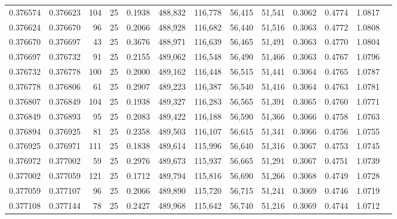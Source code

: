 \begin{tabular}{rrrrrrrrrrrrr}
0.376574 & 0.376623 &   104 &  25 &                                     0.1938 & 488,832 & 116,778 &  56,415 &  51,541 & 0.3062 & 0.4774 & 1.0817 \\
0.376624 & 0.376670 &    96 &  25 &                                     0.2066 & 488,928 & 116,682 &  56,440 &  51,516 & 0.3063 & 0.4772 & 1.0808 \\
0.376670 & 0.376697 &    43 &  25 &                                     0.3676 & 488,971 & 116,639 &  56,465 &  51,491 & 0.3063 & 0.4770 & 1.0804 \\
0.376697 & 0.376732 &    91 &  25 &                                     0.2155 & 489,062 & 116,548 &  56,490 &  51,466 & 0.3063 & 0.4767 & 1.0796 \\
0.376732 & 0.376778 &   100 &  25 &                                     0.2000 & 489,162 & 116,448 &  56,515 &  51,441 & 0.3064 & 0.4765 & 1.0787 \\
0.376778 & 0.376806 &    61 &  25 &                                     0.2907 & 489,223 & 116,387 &  56,540 &  51,416 & 0.3064 & 0.4763 & 1.0781 \\
0.376807 & 0.376849 &   104 &  25 &                                     0.1938 & 489,327 & 116,283 &  56,565 &  51,391 & 0.3065 & 0.4760 & 1.0771 \\
0.376849 & 0.376893 &    95 &  25 &                                     0.2083 & 489,422 & 116,188 &  56,590 &  51,366 & 0.3066 & 0.4758 & 1.0763 \\
0.376894 & 0.376925 &    81 &  25 &                                     0.2358 & 489,503 & 116,107 &  56,615 &  51,341 & 0.3066 & 0.4756 & 1.0755 \\
0.376925 & 0.376971 &   111 &  25 &                                     0.1838 & 489,614 & 115,996 &  56,640 &  51,316 & 0.3067 & 0.4753 & 1.0745 \\
0.376972 & 0.377002 &    59 &  25 &                                     0.2976 & 489,673 & 115,937 &  56,665 &  51,291 & 0.3067 & 0.4751 & 1.0739 \\
0.377002 & 0.377059 &   121 &  25 &                                     0.1712 & 489,794 & 115,816 &  56,690 &  51,266 & 0.3068 & 0.4749 & 1.0728 \\
0.377059 & 0.377107 &    96 &  25 &                                     0.2066 & 489,890 & 115,720 &  56,715 &  51,241 & 0.3069 & 0.4746 & 1.0719 \\
0.377108 & 0.377144 &    78 &  25 &                                     0.2427 & 489,968 & 115,642 &  56,740 &  51,216 & 0.3069 & 0.4744 & 1.0712 \\

\end{tabular}

